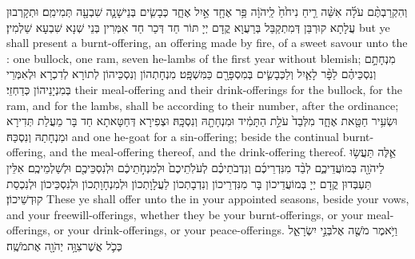 {וְהִקְרַבְתֶּ֨ם עֹלָ֜ה אִשֵּׁ֨ה רֵ֤יחַ נִיחֹ֙חַ֙ לַֽיהֹוָ֔ה פַּ֥ר אֶחָ֖ד אַ֣יִל אֶחָ֑ד כְּבָשִׂ֧ים בְּנֵי\maqqaf שָׁנָ֛ה שִׁבְעָ֖ה תְּמִימִֽם׃}
{וּתְקָרְבוּן עֲלָתָא קוּרְבַּן דְּמִתְקַבַּל בְּרַעֲוָא קֳדָם יְיָ תּוֹר חַד דְּכַר חַד אִמְּרִין בְּנֵי שְׁנָא שִׁבְעָא שַׁלְמִין׃}
{but ye shall present a burnt-offering, an offering made by fire, of a sweet savour unto the \lord: one bullock, one ram, seven he-lambs of the first year without blemish;}{}
{מִנְחָתָ֣ם וְנִסְכֵּיהֶ֗ם לַפָּ֨ר לָאַ֧יִל וְלַכְּבָשִׂ֛ים בְּמִסְפָּרָ֖ם כַּמִּשְׁפָּֽט׃}
{מִנְחָתְהוֹן וְנִסְכֵּיהוֹן לְתוֹרָא לְדִכְרָא וּלְאִמְּרֵי בְּמִנְיָנֵיהוֹן כְּדַחְזֵי׃}
{their meal-offering and their drink-offerings for the bullock, for the ram, and for the lambs, shall be according to their number, after the ordinance;}{}
{וּשְׂעִ֥יר חַטָּ֖את אֶחָ֑ד מִלְּבַד֙ עֹלַ֣ת הַתָּמִ֔יד וּמִנְחָתָ֖הּ וְנִסְכָּֽהּ׃}
{וּצְפִירָא דְּחַטָּאתָא חַד בָּר מֵעֲלַת תְּדִירָא וּמִנְחָתַהּ וְנִסְכַּהּ׃}
{and one he-goat for a sin-offering; beside the continual burnt-offering, and the meal-offering thereof, and the drink-offering thereof.}{}
{אֵ֛לֶּה תַּעֲשׂ֥וּ לַיהֹוָ֖ה בְּמוֹעֲדֵיכֶ֑ם לְבַ֨ד מִנִּדְרֵיכֶ֜ם וְנִדְבֹתֵיכֶ֗ם לְעֹלֹֽתֵיכֶם֙ וּלְמִנְחֹ֣תֵיכֶ֔ם וּלְנִסְכֵּיכֶ֖ם וּלְשַׁלְמֵיכֶֽם׃}
{אִלֵּין תַּעְבְּדוּן קֳדָם יְיָ בְּמוֹעֲדֵיכוֹן בָּר מִנִּדְרֵיכוֹן וְנִדְבָתְכוֹן לַעֲלָוָתְכוֹן וּלְמִנְחָוָתְכוֹן וּלְנִסְכֵּיכוֹן וּלְנִכְסַת קוּדְשֵׁיכוֹן׃}
{These ye shall offer unto the \lord\space in your appointed seasons, beside your vows, and your freewill-offerings, whether they be your burnt-offerings, or your meal-offerings, or your drink-offerings, or your peace-offerings.}{}
\newperek
{}%
{וַיֹּ֥אמֶר מֹשֶׁ֖ה אֶל\maqqaf בְּנֵ֣י יִשְׂרָאֵ֑ל כְּכֹ֛ל אֲשֶׁר\maqqaf צִוָּ֥ה יְהֹוָ֖ה אֶת\maqqaf מֹשֶֽׁה׃ \petucha }
